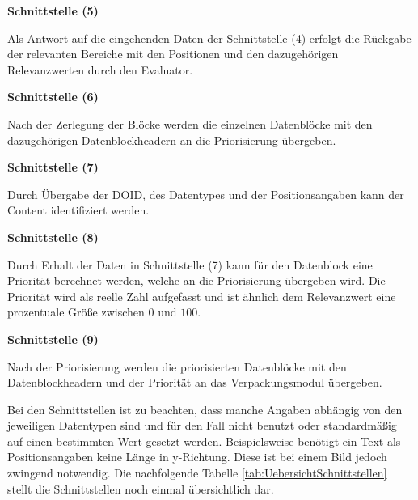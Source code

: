 \textbf{Schnittstelle (5)}

Als Antwort auf die eingehenden Daten der Schnittstelle (4)
erfolgt die Rückgabe der relevanten Bereiche mit den Positionen und den
dazugehörigen Relevanzwerten durch den Evaluator.

\textbf{Schnittstelle (6)} 

Nach der Zerlegung der Blöcke werden die einzelnen
Datenblöcke mit den dazugehörigen Datenblockheadern an die
Priorisierung übergeben.

\textbf{Schnittstelle (7)}

Durch Übergabe der \gls{DOID}, des Datentypes und der Positionsangaben kann der
Content identifiziert werden.

\textbf{Schnittstelle (8)}

Durch Erhalt der Daten in Schnittstelle (7) kann für
den Datenblock eine Priorität berechnet werden, welche an die Priorisierung übergeben
wird. Die Priorität wird als reelle Zahl aufgefasst und ist ähnlich dem
Relevanzwert eine prozentuale Größe zwischen $0$ und $100$.

\textbf{Schnittstelle (9)}

Nach der Priorisierung werden die priorisierten Datenblöcke mit den
Datenblockheadern und der Priorität an das Verpackungsmodul übergeben.

Bei den Schnittstellen ist zu beachten, dass manche Angaben abhängig von den
jeweiligen Datentypen sind und für den Fall nicht benutzt oder
standardmäßig auf einen bestimmten Wert gesetzt werden. Beispielsweise benötigt
ein Text als Positionsangaben keine Länge in y-Richtung. Diese ist bei einem
Bild jedoch zwingend notwendig. Die nachfolgende Tabelle
\ref{tab:UebersichtSchnittstellen} stellt die Schnittstellen noch einmal
übersichtlich dar.

